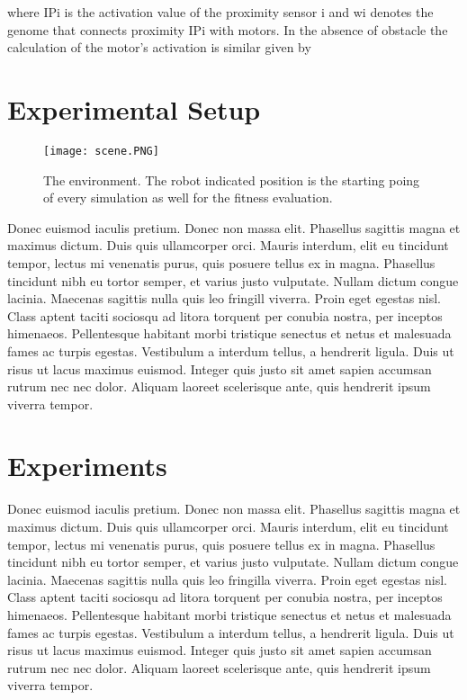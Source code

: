 \documentclass[format=acmsmall, review=false, screen=true]{acmart}
\begin{document}
where IPi is the activation value of the proximity sensor i and wi denotes the genome that connects proximity IPi with motors. In the absence of obstacle the calculation of the motor's activation is similar given by




\section{Experimental Setup}

\begin{figure}[H]
  \texttt{[image: scene.PNG]}
  \caption{The environment. The robot indicated position is the starting poing of every simulation as well for the fitness evaluation.}
  \label{fig:pioneer-robot}
\end{figure}

Donec euismod iaculis pretium. Donec non massa elit. Phasellus sagittis magna et maximus dictum. Duis quis ullamcorper orci. Mauris interdum, elit eu tincidunt tempor, lectus mi venenatis purus, quis posuere tellus ex in magna. Phasellus tincidunt nibh eu tortor semper, et varius justo vulputate. Nullam dictum congue lacinia. Maecenas sagittis nulla quis leo fringill viverra. Proin eget egestas nisl. Class aptent taciti sociosqu ad litora torquent per conubia nostra, per inceptos himenaeos. Pellentesque habitant morbi tristique senectus et netus et malesuada fames ac turpis egestas. Vestibulum a interdum tellus, a hendrerit ligula. Duis ut risus ut lacus maximus euismod. Integer quis justo sit amet sapien accumsan rutrum nec nec dolor. Aliquam laoreet scelerisque ante, quis hendrerit ipsum viverra tempor.

\section{Experiments}

Donec euismod iaculis pretium. Donec non massa elit. Phasellus sagittis magna et maximus dictum. Duis quis ullamcorper orci. Mauris interdum, elit eu tincidunt tempor, lectus mi venenatis purus, quis posuere tellus ex in magna. Phasellus tincidunt nibh eu tortor semper, et varius justo vulputate. Nullam dictum congue lacinia. Maecenas sagittis nulla quis leo fringilla viverra. Proin eget egestas nisl. Class aptent taciti sociosqu ad litora torquent per conubia nostra, per inceptos himenaeos. Pellentesque habitant morbi tristique senectus et netus et malesuada fames ac turpis egestas. Vestibulum a interdum tellus, a hendrerit ligula. Duis ut risus ut lacus maximus euismod. Integer quis justo sit amet sapien accumsan rutrum nec nec dolor. Aliquam laoreet scelerisque ante, quis hendrerit ipsum viverra tempor.
\end{document}
